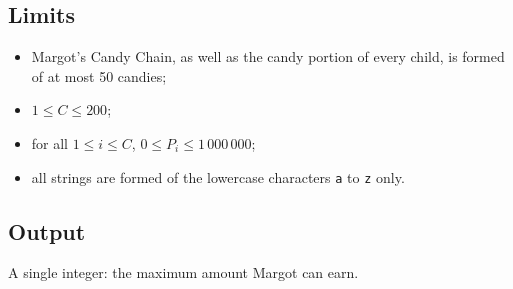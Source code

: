 \subsection*{Limits}

\begin{itemize}
  \item Margot's Candy Chain, as well as the candy portion of every
    child, is formed of at most 50 candies;
  \item $1 \leqslant C \leqslant 200$;
  \item for all $1\leq i\leq C$, $0 \leqslant P_i \leqslant
    1\,000\,000$;
  \item all strings are formed of the lowercase characters \texttt{a} to \texttt{z} only.
\end{itemize}


\subsection*{Output}

A single integer: the maximum amount Margot can earn.

\clearpage
